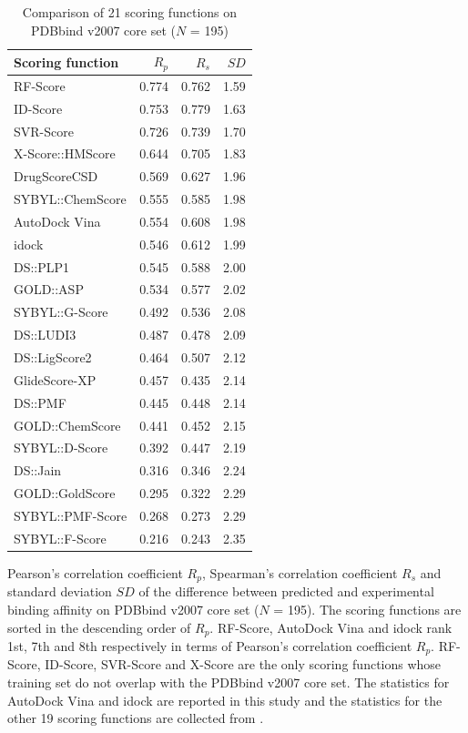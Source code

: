 \begin{table}
\caption{Comparison of 21 scoring functions on PDBbind v2007 core set ($N$ = 195)}
\begin{tabular}{lrrr}
\hline
Scoring function & $R_p$ & $R_s$ & $SD$\\
\hline
RF-Score & 0.774 & 0.762 & 1.59\\
ID-Score & 0.753 & 0.779 & 1.63\\
SVR-Score & 0.726 & 0.739 & 1.70\\
X-Score::HMScore & 0.644 & 0.705 & 1.83\\
DrugScoreCSD & 0.569 & 0.627 & 1.96\\
SYBYL::ChemScore & 0.555 & 0.585 & 1.98\\
AutoDock Vina & 0.554 & 0.608 & 1.98\\
idock & 0.546 & 0.612 & 1.99\\
DS::PLP1 & 0.545 & 0.588 & 2.00\\
GOLD::ASP & 0.534 & 0.577 & 2.02\\
SYBYL::G-Score & 0.492 & 0.536 & 2.08\\
DS::LUDI3 & 0.487 & 0.478 & 2.09\\
DS::LigScore2 & 0.464 & 0.507 & 2.12\\
GlideScore-XP & 0.457 & 0.435 & 2.14\\
DS::PMF & 0.445 & 0.448 & 2.14\\
GOLD::ChemScore & 0.441 & 0.452 & 2.15\\
SYBYL::D-Score & 0.392 & 0.447 & 2.19\\
DS::Jain & 0.316 & 0.346 & 2.24\\
GOLD::GoldScore & 0.295 & 0.322 & 2.29\\
SYBYL::PMF-Score & 0.268 & 0.273 & 2.29\\
SYBYL::F-Score & 0.216 & 0.243 & 2.35\\
\end{tabular}
\begin{flushleft}
\label{ScoringFunctionComparison} Pearson's correlation coefficient $R_p$, Spearman's correlation coefficient $R_s$ and standard deviation $SD$ of the difference between predicted and experimental binding affinity on PDBbind v2007 core set ($N$ = 195). The scoring functions are sorted in the descending order of $R_p$. RF-Score, AutoDock Vina and idock rank 1st, 7th and 8th respectively in terms of Pearson's correlation coefficient $R_p$. RF-Score, ID-Score, SVR-Score and X-Score are the only scoring functions whose training set do not overlap with the PDBbind v2007 core set. The statistics for AutoDock Vina and idock are reported in this study and the statistics for the other 19 scoring functions are collected from \citep{1313,564,1305,1295}.
\end{flushleft}
\end{table}

